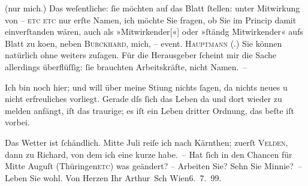                (nur mich.) Das weſentliche:{ }ſie möchten auf das Blatt{ }ſtellen: unter Mitwirkung von
               – \textsc{etc etc} nur erſte Namen, ich möchte Sie fragen, ob Sie im
               Princip damit {\pb}einverſtanden wären, auch als
                  »Mitwirkender{[}«{]} oder »ſtändg Mitwirkender« aufs Blatt zu ko{\geminationm}en, neben \textsc{Burckhard}, mich, – event. \textsc{Hauptmann} (\label{K_L00934-1v}\label{K_L00934-1}.) Sie können natürlich ohne weiters zuſagen. Für die Herausgeber{ }ſcheint mir
               die Sache allerdings überflüſſig:{ }ſie brauchten Arbeitskräfte, nicht Namen. –\pend
           
\pstart
           Ich bin noch hier; und will über meine {\pb}Sti{\geminationm}ung nichts{ }ſagen, da nichts neues u nicht erfreuliches
               vorliegt. Gerade dſs{ }ſich das Leben da und dort wieder zu melden anfängt, iſt das
               traurige; es iſt ein Leben dritter Ordnung, das beſte iſt vorbei.\pend
           
\pstart
           Das Wetter ist{ }ſchändlich. Mitte Juli reiſe ich nach Kärnthen; zuerſt \textsc{Velden}, dann zu Richard, von dem ich eine kurze
               \label{K_L00934-2v}\label{K_L00934-2} habe. – Hat{ }ſich in den Chancen für Mitte Auguſt (Thü{\pb}ringen\textsc{etc}) was geändert? – Arbeiten Sie? Sehn Sie Minnie? –\pend
           \pstart Leben Sie wohl. Von Herzen Ihr \spacefill\mbox{Arthur Sch}\pend{}
\pstart
           Wien6. 7. 99.\pend
           \endnumbering{}  \newcommand{\dateiname}{L00934}\newcommand{\titel}{Arthur Schnitzler an Hugo von Hofmannsthal, 6. 7. 1899}\newcommand{\editorInnen}{Herausgegeben von Martin Anton Müller}
